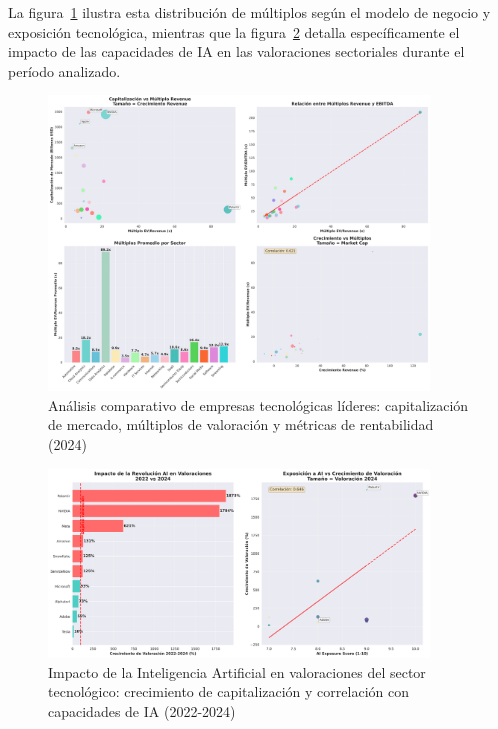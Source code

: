 La figura~\ref{fig:comparacion_empresas} ilustra esta distribución de múltiplos según el modelo de negocio y exposición tecnológica, mientras que la figura~\ref{fig:impacto_ai} detalla específicamente el impacto de las capacidades de IA en las valoraciones sectoriales durante el período analizado.

\begin{figure}[htbp]
    \centering
    \includegraphics[width=0.9\textwidth]{figuras/analisis_empresas_lideres}
    \caption{Análisis comparativo de empresas tecnológicas líderes: capitalización de mercado, múltiplos de valoración y métricas de rentabilidad (2024)}
    \label{fig:comparacion_empresas}
\end{figure}

\begin{figure}[htbp]
    \centering
    \includegraphics[width=0.9\textwidth]{figuras/impacto_ai_valoraciones}
    \caption{Impacto de la Inteligencia Artificial en valoraciones del sector tecnológico: crecimiento de capitalización y correlación con capacidades de IA (2022-2024)}
    \label{fig:impacto_ai}
\end{figure}

